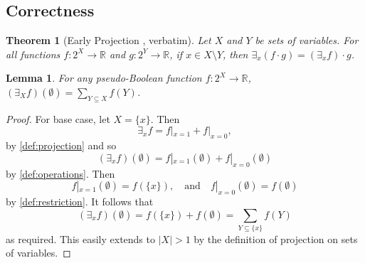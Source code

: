 \documentclass{article}
\newtheorem{theorem}{Theorem}
\newtheorem{lemma}{Lemma}
\theoremstyle{definition}
\theoremstyle{remark}
\begin{document}
\subsection{Correctness}

\begin{theorem}[Early Projection
  \cite{DBLP:conf/aaai/DudekPV20,DBLP:conf/cp/DudekPV20},
  verbatim] \label{thm:early}
  Let $X$ and $Y$ be sets of variables. For all functions $f\colon 2^X \to
  \mathbb{R}$ and $g\colon 2^Y \to \mathbb{R}$, if $x \in X \setminus Y$, then
  $\exists_x (f \cdot g) = (\exists_x f) \cdot g$.
\end{theorem}

\begin{lemma} \label{lemma:sum}
  For any pseudo-Boolean function $f\colon 2^X \to \mathbb{R}$, $(\exists_X
  f)(\emptyset) = \sum_{Y \subseteq X} f(Y)$.
\end{lemma}
\begin{proof}
  For base case, let $X = \{x\}$. Then
  \[
    \exists_xf = f|_{x=1} + f|_{x=0},
  \]
  by \cref{def:projection} and so
  \[
    (\exists_xf)(\emptyset) = f|_{x=1}(\emptyset) + f|_{x=0}(\emptyset)
  \]
  by \cref{def:operations}. Then
  \[
    f|_{x=1}(\emptyset) = f(\{x\}), \quad \text{and} \quad f|_{x=0}(\emptyset) =
    f(\emptyset)
  \]
  by \cref{def:restriction}. It follows that
  \[
    (\exists_xf)(\emptyset) = f(\{x\}) + f(\emptyset) = \sum_{Y \subseteq \{x\}}
    f(Y)
  \]
  as required. This easily extends to $|X| > 1$ by the definition of projection
  on sets of variables. %
\end{proof}
\end{document}
